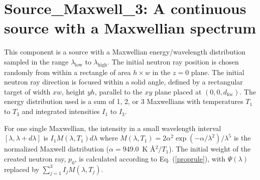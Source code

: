 \section{Source\_Maxwell\_3: A continuous source
with a Maxwellian spectrum}
\label{source-maxwell}


This component is a source with a Maxwellian energy/wavelength distribution
sampled in the range $\lambda_\textrm{low}$ to $\lambda_\textrm{high}$.
The initial neutron ray position is chosen randomly from within a
rectangle of area $h \times w$ in the $z=0$ plane.
The initial neutron ray direction is focused within
a solid angle, defined by a rectangular target of width
$xw$, height $yh$, parallel to
the $xy$ plane placed at $(0,0,d_\textrm{foc})$.
The energy distribution used is a sum of 1, 2, or 3 Maxwellians with
temperatures $T_1$ to $T_3$ and integrated intensities $I_1$ to $I_3$.

For one single Maxwellian,
the intensity in a small wavelength interval $[\lambda, \lambda+d\lambda]$ is
$ I_1 M(\lambda,T_1) d\lambda $
where
$M(\lambda,T_1) = 2 \alpha^2 \exp(-\alpha/\lambda^2) / \lambda^5 $
is the normalized Maxwell distribution ($\alpha=949.0$~K \AA$^2/T_1$).
The initial weight of the created neutron ray, $p_0$, is
calculated according to Eq. (\ref{proprule}), with $\Psi(\lambda)$ replaced
by $\sum_{j=1}^3 I_j M(\lambda,T_j)$.

%
%

